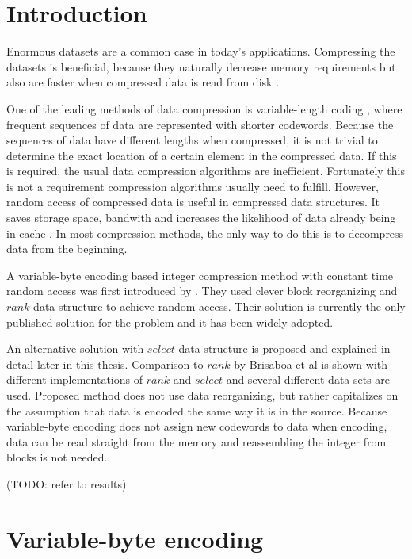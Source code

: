 \chapter{Introduction}
Enormous datasets are a common case in today's applications. Compressing the datasets is beneficial, because they 
naturally decrease memory requirements but also are faster when compressed data is read from disk \citep{Zob95}.

One of the leading methods of data compression is variable-length coding \citep{Sal99}, where frequent sequences of data
are represented with shorter codewords. Because the sequences of data have different lengths when compressed, it is 
not trivial to determine the exact location of a certain element in the compressed data. If this is required, the usual 
data compression algorithms are inefficient. Fortunately this is not a requirement compression algorithms usually need to fulfill. However, 
random access of compressed data is useful in compressed data structures. It saves storage space, bandwith and increases the likelihood
of data already being in cache \citep{Sch02}. In most compression methods, the only way to do this is to decompress data from the beginning. 

A variable-byte encoding based integer compression method with constant time random access was first introduced by \citep{Bri09}. They used clever block 
reorganizing and $rank$ data structure to achieve random access. Their solution is currently the only published solution for the problem and it 
has been widely adopted. 

An alternative solution with $select$ data structure is proposed and explained in detail later in this thesis. Comparison to $rank$ by Brisaboa et al is shown with different
implementations of $rank$ and $select$ and several different data sets are used. Proposed method does not use data 
reorganizing, but rather capitalizes on the assumption that data is encoded the same way it is in the source. Because variable-byte encoding does not assign 
new codewords to data when encoding, data can be read straight from the memory and reassembling the integer from blocks is not needed.

(TODO: refer to results)




\chapter{Variable-byte encoding}

